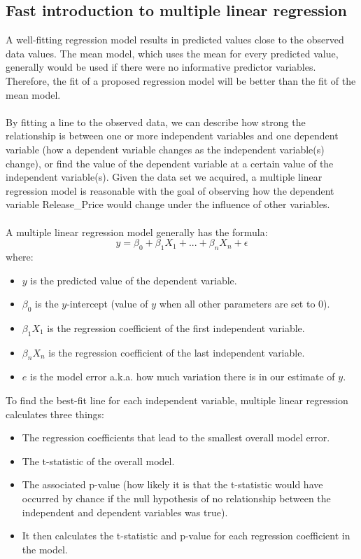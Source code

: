 \documentclass[a4paper]{article}
\begin{document}
\subsection{Fast introduction to multiple linear regression}
A well-fitting regression model results in predicted values close to the observed data values. The mean model, which uses the mean for every predicted value, generally would be used if there were no informative predictor variables. Therefore, the fit of a proposed regression model will be better than the fit of the mean model.\\\\
By fitting a line to the observed data, we can describe how strong the relationship is between one or more independent variables and one dependent variable (how a dependent variable changes as the independent variable(s) change), or find the value of the dependent variable at a certain value of the independent variable(s). Given the data set we acquired, a multiple linear regression model is reasonable with the goal of observing how the dependent variable Release\_Price would change under the influence of other variables.\\\\
A multiple linear regression model generally has the formula:\\
\begin{equation*}
    y = \beta_{0}+ \beta_{1} X_{1} + ... + \beta_{n}  X_{n} + \epsilon
\end{equation*}
where:
\begin{itemize}
    \item $y$ is the predicted value of the dependent variable.
    \item $\beta_{0}$ is the $y$-intercept (value of $y$ when all other parameters are set to 0).
    \item $\beta_{1} X_{1}$ is the regression coefficient of the first independent variable.
    \item $\beta_{n} X_{n}$ is the regression coefficient of the last independent variable.
    \item $e$ is the model error a.k.a. how much variation there is in our estimate of $y$.
\end{itemize}
To find the best-fit line for each independent variable, multiple linear regression calculates three things:
\begin{itemize}
    \item The regression coefficients that lead to the smallest overall model error.
    \item The t-statistic of the overall model.
    \item The associated p-value (how likely it is that the t-statistic would have occurred by chance if the null hypothesis of no relationship between the independent and dependent variables was true).
    \item It then calculates the t-statistic and p-value for each regression coefficient in the model.
\end{itemize}
\end{document}
